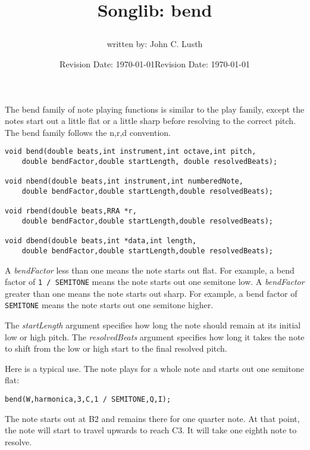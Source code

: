 \documentclass{article}
\title{Songlib: bend\\
\date{Revision Date: \today}}
\author{written by: John C. Lusth}
\date{Revision Date: \today}
\begin{document}
\maketitle

\W\subsubsection*{}
\W\htmlrule

The bend family of note playing functions is similar to the
play family, except the notes start out a little flat or
a little sharp before resolving to the correct pitch. The
bend family follows the {n,r,d} convention.

\begin{verbatim}
void bend(double beats,int instrument,int octave,int pitch,
    double bendFactor,double startLength, double resolvedBeats);

void nbend(double beats,int instrument,int numberedNote,
    double bendFactor,double startLength,double resolvedBeats);

void rbend(double beats,RRA *r,
    double bendFactor,double startLength,double resolvedBeats);

void dbend(double beats,int *data,int length,
    double bendFactor,double startLength,double resolvedBeats);
\end{verbatim}

A {\it bendFactor} less than one means the note starts out flat.
For example, a bend factor of \verb!1 / SEMITONE! means the note starts
out one semitone low.
A {\it bendFactor} greater than one means the note starts out sharp.
For example, a bend factor of \verb!SEMITONE! means the note starts
out one semitone higher.

The {\it startLength} argument specifies how long the note should
remain at its initial low or high pitch.
The {\it resolvedBeats} argument specifies how long it takes
the note to shift from the low or high start to the final resolved
pitch.

Here is a typical use. The note plays for a whole note and
starts out one semitone flat:

\begin{verbatim}
bend(W,harmonica,3,C,1 / SEMITONE,Q,I);
\end{verbatim}

The note starts out at B2 and remains there for one quarter note.
At that point, the note will start to travel upwards to reach
C3. It will take one eighth note to resolve.
\end{document}
